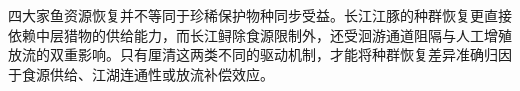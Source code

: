 四大家鱼资源恢复并不等同于珍稀保护物种同步受益。长江江豚的种群恢复更直接依赖中层猎物的供给能力，而长江鲟除食源限制外，还受洄游通道阻隔与人工增殖放流的双重影响。只有厘清这两类不同的驱动机制，才能将种群恢复差异准确归因于食源供给、江湖连通性或放流补偿效应。
